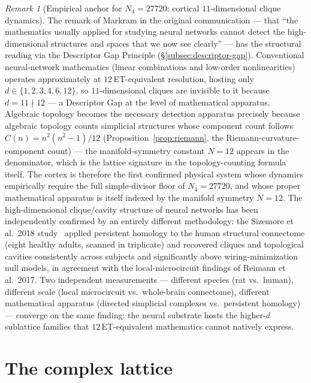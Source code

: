 \documentclass[11pt,a4paper]{article}
\theoremstyle{definition}
\theoremstyle{remark}
\newtheorem{remark}[theorem]{Remark}
\begin{document}
\begin{remark}[Empirical anchor for $N_{4}=27720$: cortical $11$-dimensional clique dynamics]
The remark of Markram in the original communication --- that ``the mathematics usually applied for studying neural networks cannot detect the high-dimensional structures and spaces that we now see clearly'' --- has the structural reading via the Descriptor Gap Principle (\S\ref{subsec:descriptor-gap}). Conventional neural-network mathematics (linear combinations and low-order nonlinearities) operates approximately at $12$\,ET-equivalent resolution, hosting only $d \in \{1,2,3,4,6,12\}$, so $11$-dimensional cliques are invisible to it because $d=11 \nmid 12$ --- a Descriptor Gap at the level of mathematical apparatus. Algebraic topology becomes the necessary detection apparatus precisely because algebraic topology counts simplicial structures whose component count follows $C(n) = n^{2}(n^{2}-1)/12$ (Proposition~\ref{prop:riemann}, the Riemann-curvature-component count) --- the manifold-symmetry constant $N=12$ appears in the denominator, which is the lattice signature in the topology-counting formula itself. The cortex is therefore the first confirmed physical system whose dynamics empirically require the full simple-divisor floor of $N_{4}=27720$, and whose proper mathematical apparatus is itself indexed by the manifold symmetry $N=12$. The high-dimensional clique/cavity structure of neural networks has been independently confirmed by an entirely different methodology: the Sizemore et al.\ 2018 study~\cite{Sizemore2018} applied persistent homology to the human structural connectome (eight healthy adults, scanned in triplicate) and recovered cliques and topological cavities consistently across subjects and significantly above wiring-minimization null models, in agreement with the local-microcircuit findings of Reimann et al.\ 2017. Two independent measurements --- different species (rat vs.\ human), different scale (local microcircuit vs.\ whole-brain connectome), different mathematical apparatus (directed simplicial complexes vs.\ persistent homology) --- converge on the same finding: the neural substrate hosts the higher-$d$ sublattice families that $12$\,ET-equivalent mathematics cannot natively express.
\end{remark}

\section{The complex lattice}\label{sec:complex}
\end{document}
